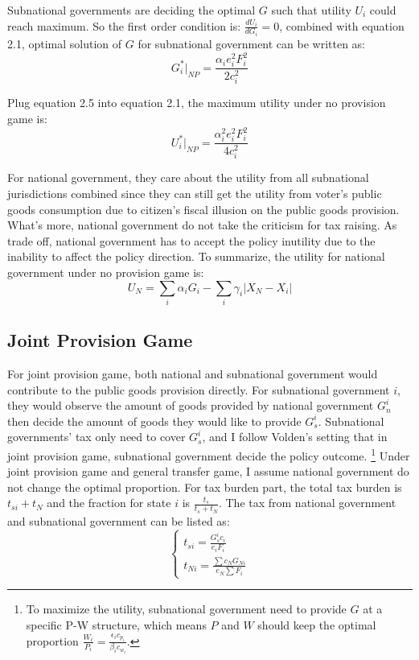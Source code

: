 \begin{itemize}
Subnational governments are deciding the optimal $G$ such that utility $U_i$ could reach maximum. So the first order condition is:
$\frac{dU_i}{dG_i}=0$, combined with equation 2.1, optimal solution of $G$ for subnational government can be written as:
\begin{equation}
  G_i^*|_{NP}=\frac{\alpha_i e_i^2 F_i^2}{2 c_i^2}
\end{equation}

Plug equation 2.5 into equation 2.1, the maximum utility under no provision game is:
\begin{equation}
  U_i^*|_{NP}=\frac{\alpha_i^2 e_i^2 F_i^2}{4c_i^2}
\end{equation}

For national government, they care about the utility from all subnational jurisdictions combined since they can still get the utility from voter's public goods consumption due to citizen's fiscal illusion on the public goods provision. What's more, national government do not take the criticism for tax raising. As trade off, national government has to accept the policy inutility due to the inability to affect the policy direction. To summarize, the utility for national government under no provision game is:
$$U_N=\sum_i\alpha_i G_i-\sum_i \gamma_i|X_N-X_i|$$

\subsection{Joint Provision Game}
For joint provision game, both national and subnational government would contribute to the public goods provision directly. For subnational government $i$, they would observe the amount of goods provided by national government $G_n^i$ then decide the amount of goods they would like to provide $G_s^i$. Subnational governments' tax only need to cover $G_s^i$, and I follow Volden's setting that in joint provision game, subnational government decide the policy outcome. \footnote{To maximize the utility, subnational government need to provide $G$ at a specific P-W structure, which means $P$ and $W$ should keep the optimal proportion $\frac{W_i}{P_i}=\frac{\epsilon_i c_{p_i}}{\beta_ic_{w_i}}$.} Under joint provision game and general transfer game, I assume national government do not change the optimal proportion. For tax burden part, the total tax burden is $t_{si}+t_N$ and the fraction for state $i$ is $\frac{t_s}{t_s+t_N}$. The tax from national government and subnational government can be listed as:
$$
  \left\{\begin{array}{l}
    t_{si}= \frac{G_s^i c_{i}}{e_i F_i} \\
    t_{Ni}=\frac{\sum c_N G_{Ni}}{e_N\sum F_i }
  \end{array}\right.
$$


\end{itemize}
